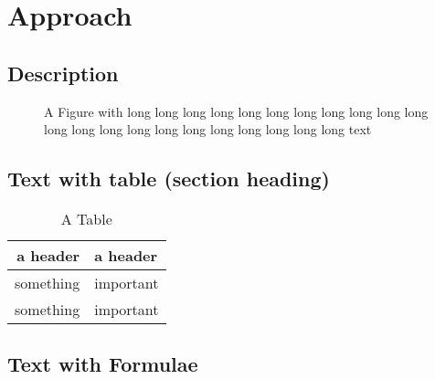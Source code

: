 \chapter{Approach}
\section{Description}
\Blindtext
\begin{figure}
\centering
{}
\caption{A Figure with long long long long long long long long long long long
long long long long long long long long long long long text}
\label{fig:one}
\end{figure}


\section[tocentry={Text with table (TOC entry)},%
head={Text with table (page head)}]%
{Text with table (section heading)}
\Blindtext

\begin{table}
\centering
\begin{tabular}{rl}
\toprule
\textbf{a header} & \textbf{a header}\\
\midrule
something & important\\
something & important\\
\bottomrule
\end{tabular}
\caption{A Table}
\label{tab:one}
\end{table}

\section{Text with Formulae}
\blindmathpaper[8]
